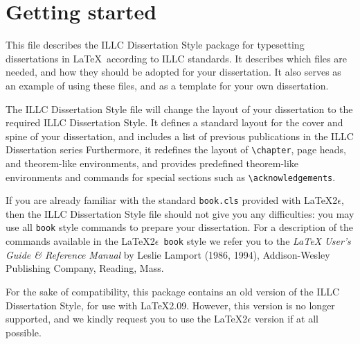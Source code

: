 \chapter{Getting started}

This file describes the ILLC Dissertation Style package for
typesetting dissertations in \LaTeX\ according to ILLC standards.
It describes which files are needed, and how they should be adopted
for your dissertation.
It also serves as an example of using these files, and as a template
for your own dissertation.

The ILLC Dissertation Style file will change the
layout of your dissertation to the required ILLC Dissertation Style.
It defines a standard layout for the cover and spine of your dissertation,
and includes a list of previous publications in the ILLC Dissertation series
Furthermore, it redefines the layout of \verb|\chapter|, page heads,
and theorem-like environments,
and provides predefined theorem-like environments and
commands for special sections such as \verb|\acknowledgements|.

If you are already familiar with the standard {\tt book.cls} provided with
\LaTeX 2$\epsilon$, then the ILLC Dissertation Style file should not give you
any difficulties: you may use all {\tt book} style commands to prepare 
your dissertation.
For a description of the commands available in the \LaTeX 2$\epsilon$\ 
{\tt book} style we refer you to the {\em \LaTeX{} User's Guide \& Reference
Manual\/} by Leslie Lamport (1986, 1994), Addison-Wesley Publishing
Company, Reading, Mass.

For the sake of compatibility, this package contains an old version of the
ILLC Dissertation Style, for use with \LaTeX 2.09. However, this version
is no longer supported, and we kindly request you to use the
\LaTeX 2$\epsilon$ version if at all possible.

